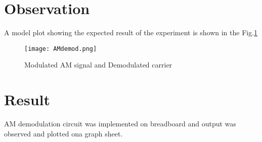 \section*{Observation}
A model plot showing the expected result of the experiment is shown in the Fig.\ref{AMdemod}
\begin{figure}
\texttt{[image: AMdemod.png]}
\caption{Modulated AM signal and Demodulated carrier}
\label{AMdemod}
\end{figure}

\section*{Result}

AM demodulation circuit was implemented on breadboard and output was observed and plotted ona graph sheet.
